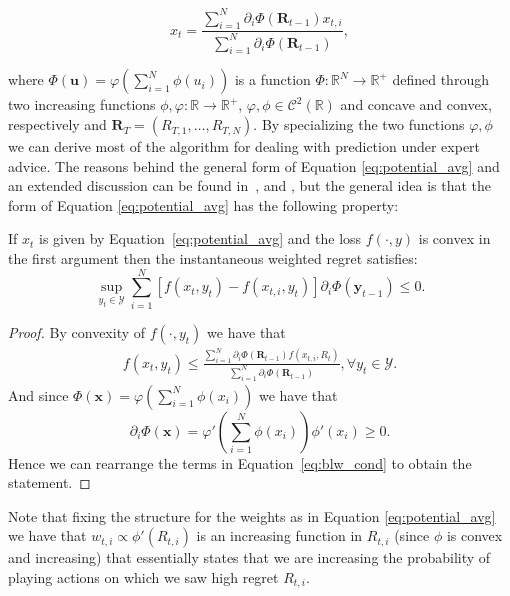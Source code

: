 \begin{equation}\label{eq:potential_avg}
x_t = \frac{\sum\limits_{i=1}^{N}\partial_i \Phi(\mathbf R_{t-1}) x_{t,i}}{\sum\limits_{i=1}^{N}\partial_i \Phi(\mathbf R_{t-1}) },
\end{equation}

where $\Phi(\mathbf u)=\varphi\left(\sum\limits_{i=1}^N\phi(u_i)\right)$ is a function $\Phi:\mathbb R^N\to\mathbb R^+$ defined through two increasing functions $\phi,\varphi:\mathbb R\to\mathbb R^+$, $\varphi,\phi\in\mathcal C^2(\mathbb R)$ and concave and convex, respectively and $\mathbf R_T=(R_{T,1},\ldots,R_{T,N})$.
By specializing the two functions $\varphi,\phi$ we can derive most of the algorithm for dealing with prediction under expert advice.
The reasons behind the general form of Equation \eqref{eq:potential_avg} and an extended discussion can be found in~\cite{hart2001general}, \cite{cesa2003potential} and \cite{blackwell1956analog}, but the general idea is that the form of Equation \eqref{eq:potential_avg} has the following property:

\begin{theorem}\cite{cesa2003potential}
	If $x_t$ is given by Equation~\eqref{eq:potential_avg} and the loss $f(\cdot,y)$ is convex in the first argument then the instantaneous weighted regret satisfies:  
	$$\sup\limits_{y_t\in\mathcal Y}\sum\limits_{i=1}^N[f(x_t,y_t)-f(x_{t,i},y_t)]\partial_i \Phi(\mathbf y_{t-1}) \le 0.$$
\end{theorem}

\begin{proof}
	By convexity of $f(\cdot,y_t)$ we have that 
\begin{align}\label{eq:blw_cond}
	f(x_t,y_t)\le\frac{\sum\limits_{i=1}^N\partial_i\Phi(\mathbf R_{t-1})f(x_{t,i},R_t)}{\sum\limits_{i=1}^N\partial_i\Phi(\mathbf R_{t-1})}, \forall y_t\in\mathcal Y.
\end{align}
And since $\Phi(\mathbf x)=\varphi\left(\sum\limits_{i=1}^N \phi(x_i)\right)$ we have that $$\partial_i\Phi(\mathbf x)=\varphi'\left(\sum\limits_{i=1}^N\phi(x_i)\right)\phi'(x_i)\ge0.$$
Hence we can rearrange the terms in Equation~\eqref{eq:blw_cond} to obtain the statement.
\end{proof}

Note that fixing the structure for the weights as in Equation \eqref{eq:potential_avg} we have that $w_{t,i}\propto\phi'(R_{t,i})$ is an increasing function in $R_{t,i}$ (since $\phi$ is convex and increasing) that essentially states that we are increasing the probability of playing actions on which we saw high regret $R_{t,i}$.

